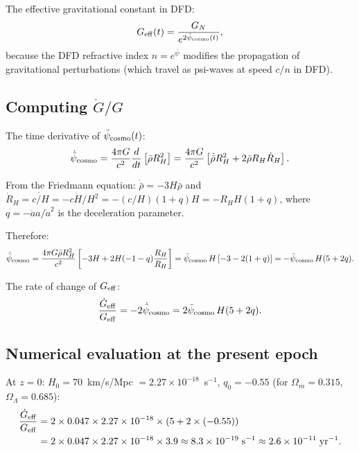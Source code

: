 \documentclass[11pt]{article}
\newcommand{\ee}[1]{\times 10^{#1}}
\newcommand{\rhobar}{\bar{\rho}}
\newcommand{\psibar}{\bar{\psi}}
\begin{document}
The effective gravitational constant in DFD:
\begin{equation}
G_{\rm eff}(t) = \frac{G_N}{e^{2\psibar_{\rm cosmo}(t)}},
\label{eq:Geff}
\end{equation}
because the DFD refractive index $n = e^{\psibar}$ modifies the propagation
of gravitational perturbations (which travel as psi-waves at speed $c/n$
in DFD).

\subsection{Computing $\dot{G}/G$}

The time derivative of $\psibar_{\rm cosmo}(t)$:
\begin{equation}
\dot{\psibar}_{\rm cosmo} = \frac{4\pi G}{c^2}\frac{d}{dt}\left[\rhobar R_H^2\right]
= \frac{4\pi G}{c^2}\left[\dot{\rhobar}R_H^2 + 2\rhobar R_H\dot{R}_H\right].
\label{eq:psidot}
\end{equation}

From the Friedmann equation: $\dot{\rhobar} = -3H\rhobar$ and
$\dot{R}_H = \dot{c/H} = -c\dot{H}/H^2 = -(c/H)(1+q)H = -R_H H(1+q)$,
where $q = -\ddot{a}a/\dot{a}^2$ is the deceleration parameter.

Therefore:
\begin{equation}
\dot{\psibar}_{\rm cosmo} = \frac{4\pi G\rhobar R_H^2}{c^2}
\left[-3H + 2H(-1-q)\frac{R_H}{R_H}\right]
= \psibar_{\rm cosmo}\,H\left[-3 - 2(1+q)\right]
= -\psibar_{\rm cosmo}\,H(5+2q).
\label{eq:psidot-num}
\end{equation}

The rate of change of $G_{\rm eff}$:
\begin{equation}
\frac{\dot{G}_{\rm eff}}{G_{\rm eff}} = -2\dot{\psibar}_{\rm cosmo}
= 2\psibar_{\rm cosmo}\,H(5+2q).
\label{eq:Gdot}
\end{equation}

\subsection{Numerical evaluation at the present epoch}

At $z = 0$: $H_0 = 70$~km/s/Mpc $= 2.27\ee{-18}$~s$^{-1}$,
$q_0 = -0.55$ (for $\Omega_m = 0.315$, $\Omega_\Lambda = 0.685$):
\begin{align}
\frac{\dot{G}_{\rm eff}}{G_{\rm eff}} &= 2 \times 0.047 \times 2.27\ee{-18} \times (5 + 2\times(-0.55))
\notag\\
&= 2 \times 0.047 \times 2.27\ee{-18} \times 3.9
\approx 8.3\ee{-19}\;\text{s}^{-1}
\approx 2.6\ee{-11}\;\text{yr}^{-1}.
\label{eq:Gdot-num}
\end{align}
\end{document}
